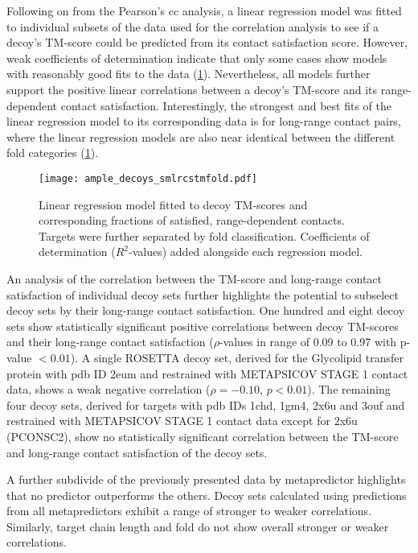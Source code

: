 Following on from the Pearson's \gls{cc} analysis, a linear regression model was fitted to individual subsets of the data used for the correlation analysis to see if a decoy's TM-score could be predicted from its contact satisfaction score. However, weak coefficients of determination indicate that only some cases show models with reasonably good fits to the data (\cref{fig:ample_decoys_smlrcstmfold}). Nevertheless, all models further support the positive linear correlations between a decoy's TM-score and its range-dependent contact satisfaction. Interestingly, the strongest and best fits of the linear regression model to its corresponding data is for long-range contact pairs, where the linear regression models are also near identical between the different fold categories (\cref{fig:ample_decoys_smlrcstmfold}).

\begin{figure}[H]
	\centering
	\texttt{[image: ample\_decoys\_smlrcstmfold.pdf]}
        \caption[Linear regression model between decoy TM-score and contact satisfaction]{Linear regression model fitted to decoy TM-scores and corresponding fractions of satisfied, range-dependent contacts. Targets were further separated by fold classification. Coefficients of determination ($R^2$-values) added alongside each regression model.}
	\label{fig:ample_decoys_smlrcstmfold}
\end{figure}

An analysis of the correlation between the TM-score and long-range contact satisfaction of individual decoy sets further highlights the potential to subselect decoy sets by their long-range contact satisfaction. One hundred and eight decoy sets show statistically significant positive correlations between decoy TM-scores and their long-range contact satisfaction ($\rho$-values in range of 0.09 to 0.97 with p-value $<0.01$). A single ROSETTA decoy set, derived for the Glycolipid transfer protein with \gls{pdb} ID 2eum and restrained with METAPSICOV STAGE 1 contact data, shows a weak negative correlation ($\rho=-0.10$, $p<0.01$). The remaining four decoy sets, derived for targets with \gls{pdb} IDs 1chd, 1gm4, 2x6u and 3ouf and restrained with METAPSICOV STAGE 1 contact data except for 2x6u (PCONSC2), show no statistically significant correlation between the TM-score and long-range contact satisfaction of the decoy sets. 

A further subdivide of the previously presented data by metapredictor highlights that no predictor outperforms the others. Decoy sets calculated using predictions from all metapredictors exhibit a range of stronger to weaker correlations. Similarly, target chain length and fold do not show overall stronger or weaker correlations. 

